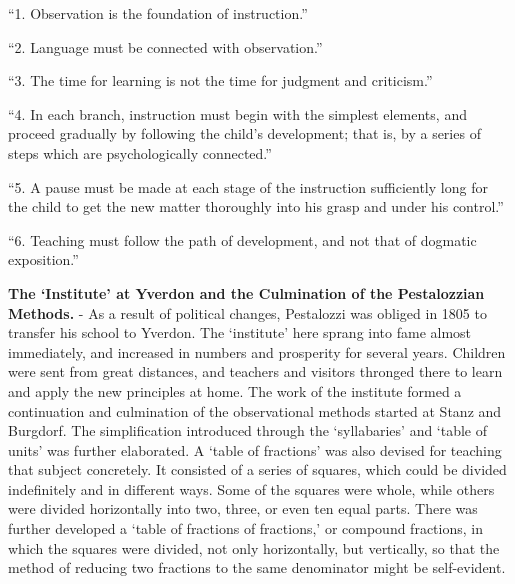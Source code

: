 \documentclass[
]{book}
\begin{document}
``1. Observation is the foundation of instruction.''

``2. Language must be connected with observation.''

``3. The time for learning is not the time for judgment and criticism.''

``4. In each branch, instruction must begin with the simplest elements, and proceed gradually by following the child's development; that is, by a series of steps which are psychologically connected.''

``5. A pause must be made at each stage of the instruction sufficiently long for the child to get the new matter thoroughly into his grasp and under his control.''

``6. Teaching must follow the path of development, and not that of dogmatic exposition.''

\textbf{The `Institute' at Yverdon and the Culmination of the Pestalozzian Methods.} - As a result of political changes, Pestalozzi was obliged in 1805 to transfer his school to Yverdon. The `institute' here sprang into fame almost immediately, and increased in numbers and prosperity for several years. Children were sent from great distances, and teachers and visitors thronged there to learn and apply the new principles at home. The work of the institute formed a continuation and culmination of the observational methods started at Stanz and Burgdorf. The simplification introduced through the `syllabaries' and `table of units' was further elaborated. A `table of fractions' was also devised for teaching that subject concretely. It consisted of a series of squares, which could be divided indefinitely and in different ways. Some of the squares were whole, while others were divided horizontally into two, three, or even ten equal parts. There was further developed a `table of fractions of fractions,' or compound fractions, in which the squares were divided, not only horizontally, but vertically, so that the method of reducing two fractions to the same denominator might be self-evident.
\end{document}
